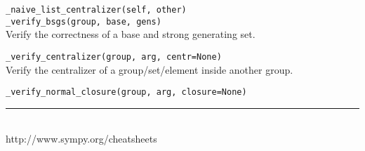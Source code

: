 \documentclass[10pt,landscape]{article}
\begin{document}
\begin{multicols}{3}
\verb!_naive_list_centralizer(self, other)!\\


\verb!_verify_bsgs(group, base, gens)!\\
Verify the correctness of a base and strong generating set.

\verb!_verify_centralizer(group, arg, centr=None)!\\
Verify the centralizer of a group/set/element inside another group.

\verb!_verify_normal_closure(group, arg, closure=None)!\\



\rule{0.3\linewidth}{0.25pt}
\scriptsize\\
http://www.sympy.org/cheatsheets


\end{multicols}
\end{document}
